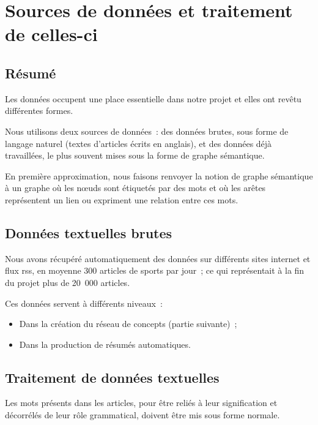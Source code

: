 \documentclass[a4paper, 12pt]{article}
\begin{document}
\section{Sources de données et traitement de celles-ci}

\subsection{Résumé}

Les données occupent une place essentielle dans notre projet et elles ont revêtu différentes formes.

Nous utilisons deux sources de données~: des données brutes, sous forme de langage naturel (textes d'articles écrits en anglais), et des données déjà travaillées, le plus souvent mises sous la forme de graphe sémantique.

\begin{definition}
En première approximation, nous faisons renvoyer la notion de graphe sémantique à un graphe où les nœuds sont étiquetés par des mots et où les arêtes représentent un lien ou expriment une relation entre ces mots.
\end{definition}


\subsection{Données textuelles brutes}

Nous avons récupéré automatiquement des données sur différents sites internet et flux rss, en moyenne 300 articles de sports par jour~; ce qui représentait à la fin du projet plus de 20~000 articles.

Ces données servent à différents niveaux~:
\begin{itemize}
 \item Dans la création du réseau de concepts (partie suivante)~;
 \item Dans la production de résumés automatiques.
\end{itemize}



\subsection{Traitement de données textuelles}

Les mots présents dans les articles, pour être reliés à leur signification et décorrélés de leur rôle grammatical, doivent être mis sous forme normale.
\end{document}
